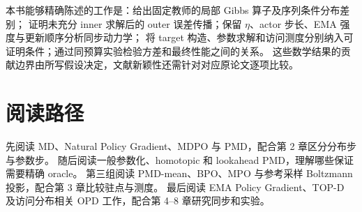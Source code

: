 本书能够精确陈述的工作是：给出固定教师的局部 Gibbs 算子及序列条件分布差别；
证明未充分 inner 求解后的 outer 误差传播；保留 $\eta$、actor 步长、EMA 强度与更新顺序分析同步动力学；
将 target 构造、参数求解和访问测度分别纳入可证明条件；通过同预算实验检验方差和最终性能之间的关系。
这些数学结果的贡献边界由所写假设决定，文献新颖性还需针对对应原论文逐项比较。

\section{阅读路径}
先阅读 MD、Natural Policy Gradient、MDPO 与 PMD，配合第 2 章区分分布步与参数步。
随后阅读一般参数化、homotopic 和 lookahead PMD，理解哪些保证需要精确 oracle。
第三组阅读 PMD-mean、BPO、MPO 与参考采样 Boltzmann 投影，配合第 3 章比较驻点与测度。
最后阅读 EMA Policy Gradient、TOP-D 及访问分布相关 OPD 工作，配合第 4--8 章研究同步和实验。
